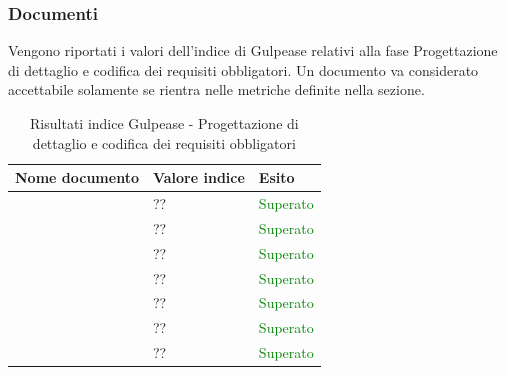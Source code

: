 	 	\subsubsection{Documenti}	 	
	 	Vengono riportati i valori dell'indice di Gulpease relativi alla fase Progettazione di dettaglio e codifica dei requisiti obbligatori. Un documento va considerato accettabile solamente se rientra nelle metriche definite nella sezione.
		\begin{table}[!ht]
			\begin{center}
				\begin{tabularx}{0.9\textwidth}{|l|l|X|}
					\hline
					\textbf{Nome documento} & \textbf{Valore indice} & \textbf{Esito}\\
					\hline						
					\docNameVersionAdR & ?? & \textcolor{green}{Superato}\\
					\hline
					\docNameVersionGlo & ?? & \textcolor{green}{Superato}\\
					\hline					
					\docNameVersionNdP & ?? & \textcolor{green}{Superato}\\
					\hline					
					\docNameVersionPdP & ?? & \textcolor{green}{Superato}\\
					\hline					
					\docNameVersionPdQ & ?? & \textcolor{green}{Superato}\\
					\hline					
					\docNameVersionSdF & ?? & \textcolor{green}{Superato}\\
					\hline	
					\docNameVersionST & ?? & \textcolor{green}{Superato}\\
					\hline			
				\end{tabularx}
			\end{center}
			\caption{Risultati indice Gulpease - Progettazione di dettaglio e codifica dei requisiti obbligatori}
		\end{table}
		
